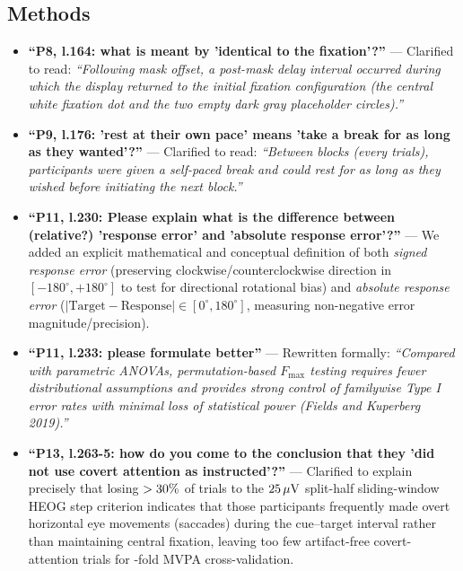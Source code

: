 \documentclass[11pt]{article}
\begin{document}
\subsection*{Methods}
\begin{itemize}[leftmargin=1.5em]
    \item \textbf{``P8, l.164: what is meant by 'identical to the fixation'?''} --- \textcolor{revblue}{Clarified to read: \textit{``Following mask offset, a \statPostMaskBlankMs{} post-mask delay interval occurred during which the display returned to the initial fixation configuration (the central white fixation dot and the two empty dark gray placeholder circles).''}}
    \item \textbf{``P9, l.176: 'rest at their own pace' means 'take a break for as long as they wanted'?''} --- \textcolor{revblue}{Clarified to read: \textit{``Between blocks (every \statTrialsPerBlock{} trials), participants were given a self-paced break and could rest for as long as they wished before initiating the next block.''}}
    \item \textbf{``P11, l.230: Please explain what is the difference between (relative?) 'response error' and 'absolute response error'?''} --- \textcolor{revblue}{We added an explicit mathematical and conceptual definition of both \textit{signed response error} (preserving clockwise/counterclockwise direction in $[-180^\circ, +180^\circ]$ to test for directional rotational bias) and \textit{absolute response error} ($|\text{Target} - \text{Response}| \in [0^\circ, 180^\circ]$, measuring non-negative error magnitude/precision).}
    \item \textbf{``P11, l.233: please formulate better''} --- \textcolor{revblue}{Rewritten formally: \textit{``Compared with parametric ANOVAs, permutation-based $F_{\max}$ testing requires fewer distributional assumptions and provides strong control of familywise Type I error rates with minimal loss of statistical power (Fields and Kuperberg 2019).''}}
    \item \textbf{``P13, l.263-5: how do you come to the conclusion that they 'did not use covert attention as instructed'?''} --- \textcolor{revblue}{Clarified to explain precisely that losing $>30\%{}$ of trials to the $25\,\mu\text{V}{}$ split-half sliding-window HEOG step criterion indicates that those participants frequently made overt horizontal eye movements (saccades) during the cue--target interval rather than maintaining central fixation, leaving too few artifact-free covert-attention trials for \statCVFolds{}-fold MVPA cross-validation.}

\end{itemize}
\end{document}
